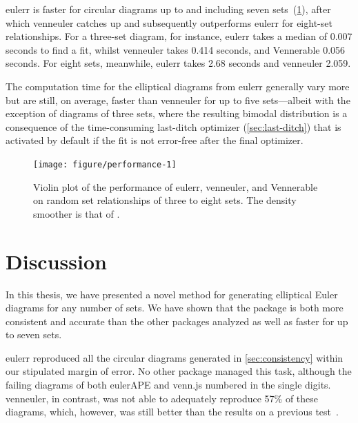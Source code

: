\documentclass[
  oneside,
  openany,
  numbers=noendperiod,
  parskip=half,
  bibliography=totoc
]{scrbook}\usepackage[]{graphicx}\usepackage{xcolor}
\newenvironment{knitrout}{}{} %
\newcommand{\pkg}[1]{{\fontseries{b}\selectfont #1}}
\begin{document}
\pkg{eulerr} is faster for circular diagrams up to and including seven
sets~(\cref{fig:performance}), after which \pkg{venneuler} catches
up and subsequently outperforms \pkg{eulerr} for eight-set relationships. For a three-set diagram,
for instance, \pkg{eulerr} takes a median of
0.007
seconds to find a fit, whilst \pkg{venneuler} takes 0.414
seconds, and \pkg{Vennerable} 0.056
seconds. For eight sets, meanwhile, \pkg{eulerr} takes
2.68
seconds and \pkg{venneuler} 2.059.

The computation time for the elliptical
diagrams from \pkg{eulerr} generally vary more but are still, on average,
faster than \pkg{venneuler} for up to five sets---albeit with the exception
of diagrams of three sets, where the resulting bimodal distribution is a
consequence of the time-consuming
last-ditch optimizer (\cref{sec:last-ditch}) that is activated by default
if the fit is not error-free after the final optimizer.

\begin{figure}[hbtp]
\begin{knitrout}\small
{}\color{fgcolor}

{\centering \texttt{[image: figure/performance-1]} 

}



\end{knitrout}
\caption{Violin plot of the performance of \pkg{eulerr}, \pkg{venneuler}, and \pkg{Vennerable} on
random set relationships of three to eight sets. The density smoother is that of \citet{Sheather_1991}.}
\label{fig:performance}
\end{figure}

\chapter{Discussion}
\label{ch:discussion}

In this thesis, we have presented a novel method for generating elliptical Euler diagrams
for any number of sets. We have shown that the package
is both more consistent and accurate than the other packages analyzed as well as
faster for up to seven sets.

\pkg{eulerr} reproduced all the circular diagrams
generated in \cref{sec:consistency} within our stipulated margin of error.
No other package managed this task, although the failing diagrams of both
\pkg{eulerAPE} and \pkg{venn.js} numbered in the single digits.
\pkg{venneuler}, in contrast, was not able to adequately
reproduce 57\%
of these diagrams, which, however, was still
better than the results on a previous
test~\citep{Frederickson_2015b}.
\end{document}
